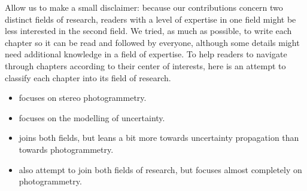 Allow us to make a small disclaimer: because our contributions concern two distinct fields of research, readers with a level of expertise in one field might be less interested in the second field. We tried, as much as possible, to write each chapter so it can be read and followed by everyone, although some details might need additional knowledge in a field of expertise. To help readers to navigate through chapters according to their center of interests, here is an attempt to classify each chapter into its field of research.
\begin{itemize}
    \item {} focuses on stereo photogrammetry.
    \item {} focuses on the modelling of uncertainty.
    \item {} joins both fields, but leans a bit more towards uncertainty propagation than towards photogrammetry. 
    \item {} also attempt to join both fields of research, but focuses almost completely on photogrammetry.
\end{itemize}

